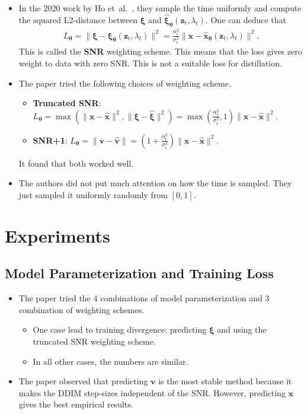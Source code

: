 \documentclass[10pt]{article}
\newcommand{\ve}[1]{\mathbf{#1}}
\newcommand{\ves}[1]{\boldsymbol{#1}}
\newcommand{\etal}{{et~al.}}
\begin{document}
\begin{itemize}
  \item In the 2020 work by Ho \etal~\cite{Ho:2020}, they sample the time uniformly and compute the squared L2-distance between $\ves{\xi}$ and $\hat{\ves{\xi}}_{\ves{\theta}}(\ve{z}_t, \lambda_t)$. One can deduce that
  \begin{align*}
    L_{\ves{\theta}} = \| \ves{\xi} - \ves{\xi}_{\ves{\theta}}(\ve{z}_t,\lambda_t) \|^2 = \frac{\alpha_t^2}{\sigma_t^2} \| \ve{x} - \hat{\ve{x}}_{\ves{\theta}}(\ve{z}_t, \lambda_t) \|^2.
  \end{align*}
  This is called the {\bf SNR} weighting scheme. This means that the loss gives zero weight to data with zero SNR. This is not a suitable loss for distillation.

  \item The paper tried the following choices of weighting scheme.
  \begin{itemize}
    \item {\bf Truncated SNR}: $L_{\ves{\theta}} = \max(\|\ve{x} - \hat{\ve{x}} \|^2, \| \ves{\xi} - \hat{\ves{\xi}} \|^2 ) = \max(\frac{\alpha_t^2}{\sigma_t^2}, 1) \| \ve{x} - \hat{\ve{x}} \|^2$.
    \item {\bf SNR+1}: $L_{\ves{\theta}} = \| \ve{v} - \hat{\ve{v}} \| = (1 + \frac{\alpha_t^2}{\sigma_t^2} ) \| \ve{x} - \hat{\ve{x}} \|^2. $
  \end{itemize}
  It found that both worked well.

  \item The authors did not put much attention on how the time is sampled. They just sampled it uniformly randomly from $[0,1]$.
\end{itemize}

\section{Experiments}

\subsection{Model Parameterization and Training Loss}

\begin{itemize}
  \item The paper tried the 4 combinations of model parameterization and 3 combination of weighting schemes.
  \begin{itemize}
    \item One case lead to training divergence: predicting $\ves{\xi}$ and using the truncated SNR weighting scheme.
    \item In all other cases, the numbers are similar.
  \end{itemize}

  \item The paper observed that predicting $\ve{v}$ is the most stable method because it makes the DDIM step-sizes independent of the SNR. However, predicting $\ve{x}$ gives the best empirical results.
\end{itemize}
\end{document}
